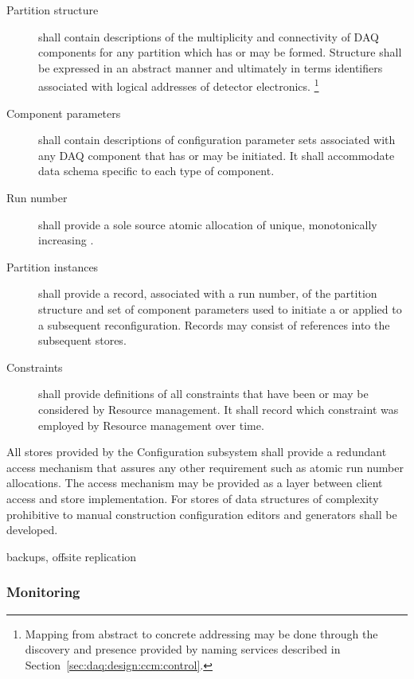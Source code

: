 \begin{description}

\item[Partition structure] shall contain descriptions of the multiplicity and connectivity of DAQ components for any partition which has or may be formed. 
  Structure shall be expressed in an abstract manner and ultimately in terms identifiers associated with logical addresses of detector electronics. \footnote{Mapping from abstract to concrete addressing may be done through the discovery and presence provided by naming services described in Section~\ref{sec:daq:design:ccm:control}.}

\item[Component parameters] shall contain descriptions of configuration parameter sets associated with any DAQ component that has or may be initiated.  It shall accommodate data schema specific to each type of component. 

\item[Run number] shall provide a sole source atomic allocation of unique, monotonically increasing .

\item[Partition instances] shall provide a record, associated with a run number, of the partition structure and set of component parameters used to initiate a  or applied to a subsequent reconfiguration.  Records may consist of references into the subsequent stores.

\item[Constraints] shall provide definitions of all constraints that have been or may be considered by Resource management. 
  It shall record which constraint was employed by Resource management over time.
\end{description}


All stores provided by the Configuration subsystem shall provide a redundant access mechanism that assures any other requirement such as atomic run number allocations. 
The access mechanism may be provided as a layer between client access and store implementation.
For stores of data structures of complexity prohibitive to manual construction configuration editors and generators shall be developed.

backups, offsite replication


\subsubsection{Monitoring}
\label{sec:daq:design:ccm:monitoring}

